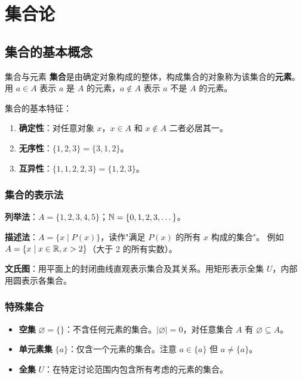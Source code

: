 \chapter{集合论}

\section{集合的基本概念}

\begin{mydefinition}{集合与元素}
\textbf{集合}是由确定对象构成的整体，构成集合的对象称为该集合的\textbf{元素}。用 $a \in A$ 表示 $a$ 是 $A$ 的元素，$a \notin A$ 表示 $a$ 不是 $A$ 的元素。
\end{mydefinition}

集合的基本特征：
\begin{enumerate}
\item \textbf{确定性}：对任意对象 $x$，$x \in A$ 和 $x \notin A$ 二者必居其一。
\item \textbf{无序性}：$\{1, 2, 3\} = \{3, 1, 2\}$。
\item \textbf{互异性}：$\{1, 1, 2, 2, 3\} = \{1, 2, 3\}$。
\end{enumerate}

\subsection{集合的表示法}

\textbf{列举法}：$A = \{1, 2, 3, 4, 5\}$；$\mathbb{N} = \{0, 1, 2, 3, \dots\}$。

\textbf{描述法}：$A = \{x \mid P(x)\}$，读作"满足 $P(x)$ 的所有 $x$ 构成的集合"。
例如 $A = \{x \mid x \in \mathbb{R}, x > 2\}$（大于 2 的所有实数）。

\textbf{文氏图}：用平面上的封闭曲线直观表示集合及其关系。用矩形表示全集 $U$，内部用圆表示各集合。

\subsection{特殊集合}

\begin{itemize}
\item \textbf{空集} $\varnothing = \{\}$：不含任何元素的集合。$|\varnothing| = 0$，对任意集合 $A$ 有 $\varnothing \subseteq A$。
\item \textbf{单元素集} $\{a\}$：仅含一个元素的集合。注意 $a \in \{a\}$ 但 $a \neq \{a\}$。
\item \textbf{全集} $U$：在特定讨论范围内包含所有考虑的元素的集合。
\end{itemize}

